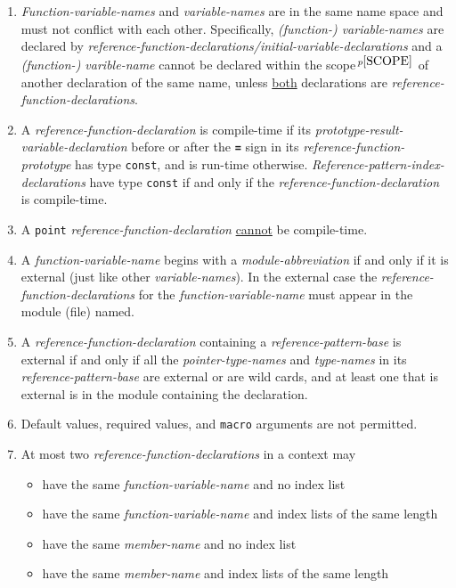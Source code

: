 \documentclass[12pt]{article}
\newcommand{\TT}[1]{{\tt \bfseries #1}}
\newcommand{\pagnote}[1]{$\,^{p\pageref{#1}}$}
\begin{document}
\begin{enumerate}
\item\label{FUNCTION-VARIABLE-NAME-SCOPE}
{\em Function-variable-names} and {\em variable-names} are in the same
name space and must not conflict with each other.  Specifically,
{\em (function-) variable-names} are declared by
{\em reference-function-declarations/initial-variable-declarations}
and a {\em (function-) varible-name} cannot be declared within the
scope\pagnote{SCOPE}
of another declaration of the same name, unless \underline{both}
declarations are {\em reference-function-declarations}.
\item
A {\em reference-function-declaration} is compile-time if
its {\em prototype-result-variable-declara\-tion} before or after the
\TT{=} sign in its {\em reference-function-prototype}
has type {\tt const}, and is run-time otherwise.
{\em Reference-pattern-index-declarations} have type {\tt const}
if and only if the {\em reference-function-declaration} is compile-time.
\item
A {\tt point} {\em reference-function-declaration}
\underline{cannot} be compile-time.
\item
A {\em function-variable-name} begins with a {\em module-abbreviation}
if and only if it is external (just like other {\em variable-names}).
In the external case the {\em reference-function-declarations} for the
{\em function-variable-name} must appear in the module (file)
named.
\item
A {\em reference-function-declaration} containing a
{\em reference-pattern-base} is external if and only if
all the {\em pointer-type-names}
and {\em type-names} in its {\em reference-pattern-base} are external or
are wild cards, and at least one that is external is in the
module containing the declaration.
\item
Default values, required values, and {\tt macro} arguments
are not permitted.
\item\label{TWO-REFERENCE-FUNCTION-DECLARATIONS}
At most two {\em reference-function-declarations} in a context may
\begin{itemize}
\item
have the same {\em function-variable-name} and no index list
\item
have the same {\em function-variable-name}
and index lists of the same length
\item
have the same {\em member-name} and no index list
\item
have the same {\em member-name}
and index lists of the same length

\end{itemize}
\end{enumerate}
\end{document}
